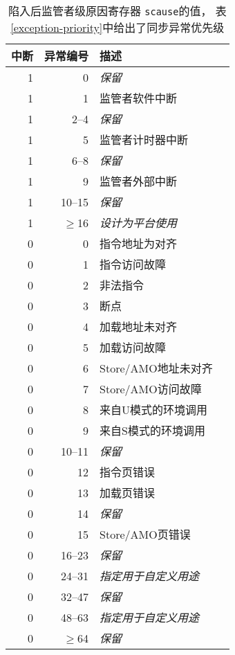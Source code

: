 \begin{table*}[h!]
\begin{center}
\begin{tabular}{|r|r|l|l|}

  \hline
  中断 & 异常编号  & 描述 \\
  \hline
  1         & 0               & {\em 保留} \\
  1         & 1               & 监管者软件中断 \\
  1         & 2--4            & {\em 保留} \\
  1         & 5               & 监管者计时器中断 \\
  1         & 6--8            & {\em 保留} \\
  1         & 9               & 监管者外部中断 \\
  1         & 10--15          & {\em 保留} \\
  1         & $\ge$16         & {\em 设计为平台使用} \\ \hline
  0         & 0               & 指令地址为对齐 \\
  0         & 1               & 指令访问故障 \\
  0         & 2               & 非法指令 \\
  0         & 3               & 断点 \\
  0         & 4               & 加载地址未对齐 \\
  0         & 5               & 加载访问故障 \\
  0         & 6               & Store/AMO地址未对齐 \\
  0         & 7               & Store/AMO访问故障 \\
  0         & 8               & 来自U模式的环境调用 \\
  0         & 9               & 来自S模式的环境调用 \\
  0         & 10--11          & {\em 保留} \\
  0         & 12              & 指令页错误 \\
  0         & 13              & 加载页错误 \\
  0         & 14              & {\em 保留} \\
  0         & 15              & Store/AMO页错误 \\
  0         & 16--23          & {\em 保留} \\
  0         & 24--31          & {\em 指定用于自定义用途} \\
  0         & 32--47          & {\em 保留} \\
  0         & 48--63          & {\em 指定用于自定义用途} \\
  0         & $\ge$64         & {\em 保留} \\
  \hline
\end{tabular}
\end{center}
\caption{陷入后监管者级原因寄存器 {\tt scause}的值，
表\ref{exception-priority}中给出了同步异常优先级}
\label{scauses}
\end{table*}

